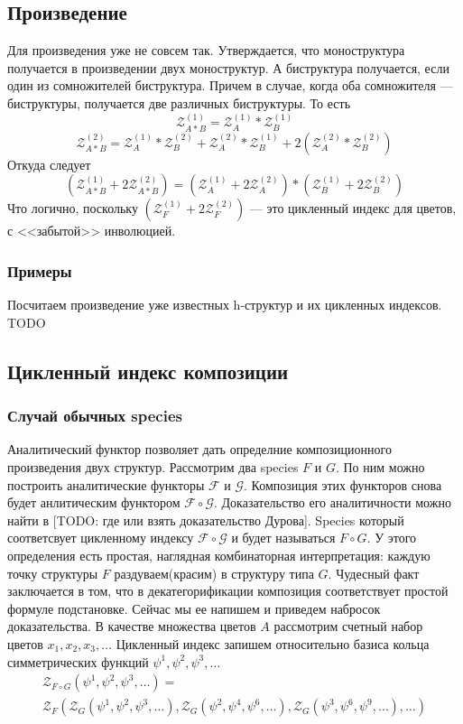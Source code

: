 \subsection{Произведение}
Для произведения уже не совсем так. Утверждается, что моноструктура получается
в произведении двух моноструктур. А биструктура получается, если один из
сомножителей биструктура. Причем в случае, когда оба сомножителя ---
биструктуры, получается две различных биструктуры. То есть
$$
\mathcal Z_{A * B}^{(1)} = \mathcal Z_A^{(1)} * \mathcal Z_B^{(1)}
$$
$$
\mathcal Z_{A * B}^{(2)} = 
\mathcal Z_A^{(1)} * \mathcal Z_B^{(2)} + 
\mathcal Z_A^{(2)} * \mathcal Z_B^{(1)} +
2 (\mathcal Z_A^{(2)} * \mathcal Z_B^{(2)})
$$
Откуда следует
$$
(\mathcal Z_{A * B}^{(1)} + 2\mathcal Z_{A * B}^{(2)}) = 
(\mathcal Z_A^{(1)} + 2\mathcal Z_A^{(2)}) * 
(\mathcal Z_B^{(1)} + 2\mathcal Z_B^{(2)})
 $$
Что логично, поскольку $(\mathcal Z_F^{(1)} + 2\mathcal Z_F^{(2)})$ --- это
цикленный индекс для цветов, с <<забытой>> инволюцией.

\subsubsection{Примеры}
Посчитаем произведение уже известных h-структур и их цикленных индексов. TODO

\subsection{Цикленный индекс композиции}
\subsubsection{Случай обычных species}
Аналитический функтор позволяет дать определние композиционного произведения
двух структур. Рассмотрим два species $F$ и $G$. По ним можно построить
аналитические функторы $\mathcal F$ и $\mathcal G$. Композиция этих функторов
снова будет анлитическим функтором $\mathcal F \circ \mathcal G$. Доказательство
его аналитичности можно найти в [TODO: где или взять доказательство Дурова].
Species который соответсвует цикленному индексу $\mathcal F \circ \mathcal G$ и
будет называться $F \circ G$. У этого определения есть простая, наглядная
комбинаторная интерпретация: каждую точку структуры $F$ раздуваем(красим) в
структуру типа $G$. Чудесный факт заключается в том, что в декатегорификации
композиция соответствует простой формуле подстановке. Сейчас мы ее напишем и
приведем набросок доказательства. В качестве множества цветов $A$ рассмотрим
счетный набор цветов $x_1, x_2, x_3, \dots$ Цикленный индекс запишем
относительно базиса кольца симметрических функций $\psi^1, \psi^2, \psi^3, \dots$
\begin{multline}
\label{eq:zfg}
	\mathcal Z_{F \circ G} (\psi^1, \psi^2, \psi^3, \dots) = \\
	\mathcal Z_F(
		\mathcal Z_G(\psi^1, \psi^2, \psi^3, \dots),
		\mathcal Z_G(\psi^2, \psi^4, \psi^6, \dots),
		\mathcal Z_G(\psi^3, \psi^6, \psi^9, \dots),
		\dots
	)
\end{multline}

